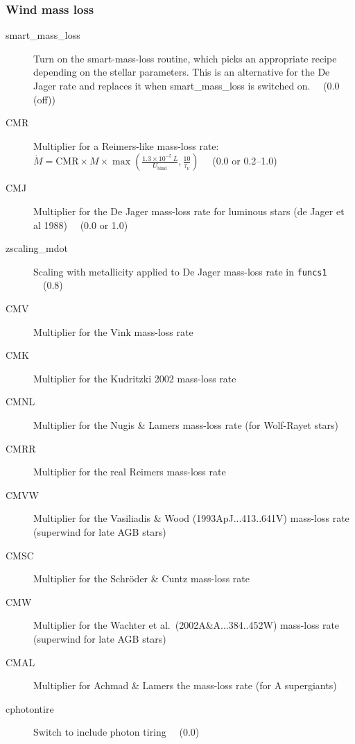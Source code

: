 \subsubsection{Wind mass loss}
\label{sec:windmassloss}
\begin{description}
\item[smart\_mass\_loss]\hypertarget{smart_mass_loss}{} Turn on the smart-mass-loss routine, which picks an appropriate recipe depending on 
  the stellar parameters. This is an alternative for the De Jager rate and replaces it when smart\_mass\_loss is switched on. \ \ (0.0 (off))
\item[CMR]\hypertarget{cmr}{} Multiplier for a Reimers-like mass-loss rate: 
  $\dot{M} = \mathrm{CMR} \times M \times \max\left(\frac{1.3\times10^{-5}\,L}{U_\mathrm{bind}},\frac{10}{\tau_\nu}\right)$ \ \ (0.0 or 0.2--1.0)
\item[CMJ]\hypertarget{cmj}{} Multiplier for the De Jager mass-loss rate for luminous stars (de Jager et al 1988)  \ \ (0.0 or 1.0)
\item[zscaling\_mdot]\hypertarget{zscaling_mdot}{} Scaling with metallicity applied to De Jager mass-loss rate in \texttt{funcs1}  \ \ (0.8)
\item[CMV]\hypertarget{cmv}{} Multiplier for the Vink mass-loss rate
\item[CMK]\hypertarget{cmk}{} Multiplier for the Kudritzki 2002 mass-loss rate
\item[CMNL]\hypertarget{cmnl}{} Multiplier for the Nugis \& Lamers  mass-loss rate (for Wolf-Rayet stars)
\item[CMRR]\hypertarget{cmrr}{} Multiplier for the real Reimers mass-loss rate
\item[CMVW]\hypertarget{cmvw}{} Multiplier for the Vasiliadis \& Wood (1993ApJ...413..641V) mass-loss rate (superwind for late AGB stars)
\item[CMSC]\hypertarget{cmsc}{} Multiplier for the Schr\"oder \& Cuntz mass-loss rate
\item[CMW]\hypertarget{cmw}{} Multiplier for the Wachter et al.\ (2002A\&A...384..452W) mass-loss rate (superwind for late AGB stars)
\item[CMAL]\hypertarget{cmal}{} Multiplier for Achmad \& Lamers the mass-loss rate (for A supergiants)
\item[cphotontire]\hypertarget{cphotontire}{} Switch to include photon tiring  \ \ (0.0)
\end{description}

